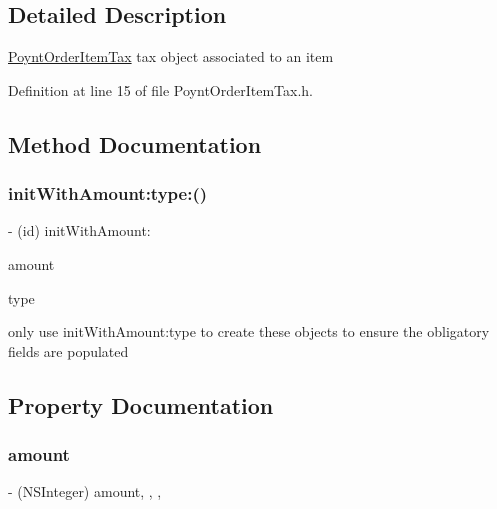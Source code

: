 \subsection{Detailed Description}
\hyperlink{interface_poynt_order_item_tax}{Poynt\+Order\+Item\+Tax}  tax object associated to an item 

Definition at line 15 of file Poynt\+Order\+Item\+Tax.\+h.



\subsection{Method Documentation}
\hypertarget{interface_poynt_order_item_tax_a64b4adba02da4a202dd84d072ce7f644}{}\label{interface_poynt_order_item_tax_a64b4adba02da4a202dd84d072ce7f644} 
\subsubsection{\texorpdfstring{init\+With\+Amount\+:type\+:()}{initWithAmount:type:()}}
{\footnotesize\ttfamily -\/ (id) init\+With\+Amount\+: \begin{DoxyParamCaption}\item[{(N\+S\+Integer)}]{amount }\item[{type:(N\+S\+String $\ast$)}]{type }\end{DoxyParamCaption}}



only use init\+With\+Amount\+:type to create these objects to ensure the obligatory fields are populated 



\subsection{Property Documentation}
\hypertarget{interface_poynt_order_item_tax_a6ff5079a7aa518c578773da69959732d}{}\label{interface_poynt_order_item_tax_a6ff5079a7aa518c578773da69959732d} 
\subsubsection{\texorpdfstring{amount}{amount}}
{\footnotesize\ttfamily -\/ (N\+S\+Integer) amount\hspace{0.3cm}{\ttfamily [read]}, {\ttfamily [write]}, {\ttfamily [nonatomic]}, {\ttfamily [assign]}}



